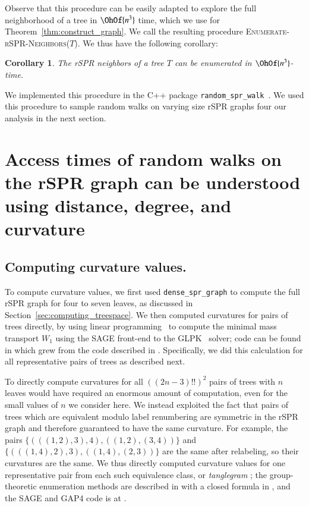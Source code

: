 \documentclass[]{elsarticle}
\newtheorem{cor}[thm]{Corollary}
\begin{document}
Observe that this procedure can be easily adapted to explore the full neighborhood of a tree in $\OhOf{n^3}$ time, which we use for Theorem~\ref{thm:construct_graph}. We call the resulting procedure \textsc{Enumerate-rSPR-Neighbors($T$)}.
We thus have the following corollary:

\begin{cor}
\label{cor:enumerate_neighbors}
	The rSPR neighbors of a tree $T$ can be enumerated in $\OhOf{n^3}$-time.
\end{cor}

We implemented this procedure in the C++ package \texttt{random\_spr\_walk}~\citep{random_spr_walk}.
We used this procedure to sample random walks on varying size rSPR graphs four our analysis in the next section.

\section{Access times of random walks on the rSPR graph can be understood using distance, degree, and curvature}

\subsection{Computing curvature values.}
\label{sec:results:curvature}
To compute curvature values, we first used \texttt{dense\_spr\_graph} to compute the full rSPR graph for four to seven leaves, as discussed in Section~\ref{sec:computing_treespace}.
We then computed curvatures for pairs of trees directly, by using linear programming~\citep{Loisel2014-hu} to compute the minimal mass transport $W_1$ using the SAGE \citep{SAGE} front-end to the GLPK~\citep{glpk} solver; code can be found in \citep{gricci} which grew from the code described in \citep{Loisel2014-hu}.
Specifically, we did this calculation for all representative pairs of trees as described next.

To directly compute curvatures for all $((2n-3)!!)^2$ pairs of trees with $n$ leaves would have required an enormous amount of computation, even for the small values of $n$ we consider here.
We instead exploited the fact that pairs of trees which are equivalent modulo label renumbering are symmetric in the rSPR graph and therefore guaranteed to have the same curvature.
For example, the pairs
$\{(((1,2),3),4), ((1,2),(3,4))\}$ and
$\{(((1,4),2),3), ((1,4),(2,3))\}$
are the same after relabeling, so their curvatures are the same.
We thus directly computed curvature values for one representative pair from each such equivalence class, or \emph{tanglegram} \citep{Venkatachalam2010-zh}; the group-theoretic enumeration methods are described in \citep{Matsen2016-cv} with a closed formula in \citep{Billey2017-ci}, and the SAGE \citep{SAGE} and GAP4 \citep{GAP4} code is at \citep{tangle}.
\end{document}
